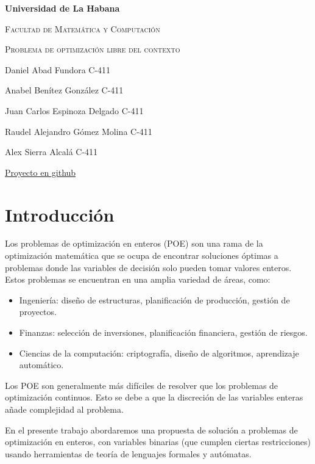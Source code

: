 \documentclass{article}
\begin{document}
\begin{titlepage}
    \centering
    {\bfseries\LARGE Universidad de La Habana \par}
    \vspace{1cm}
    {\scshape\Large Facultad de Matemática y Computación \par}
    \vspace{3cm}
    {\scshape\Huge Problema de optimización libre del contexto \par}
    \vfill

    {\Large Daniel Abad Fundora C-411 \par}
    {\Large Anabel Benítez González C-411 \par}
    {\Large Juan Carlos Espinoza Delgado C-411 \par}
    {\Large Raudel Alejandro Gómez Molina C-411 \par}
    {\Large Alex Sierra Alcalá C-411 \par}
    \vfill
    {\href{https://github.com/ARJ-Code/MMA-Project}{Proyecto en github} \par}
\end{titlepage}



\section*{Introducción}
Los problemas de optimización en enteros (POE) son una rama de la optimización matemática que se ocupa de encontrar soluciones óptimas a problemas 
donde las variables de decisión solo pueden tomar valores enteros. Estos problemas se encuentran en una amplia variedad de áreas, como:

\begin{itemize}
    \item Ingeniería: diseño de estructuras, planificación de producción, gestión de proyectos.
    \item Finanzas: selección de inversiones, planificación financiera, gestión de riesgos.
    \item Ciencias de la computación: criptografía, diseño de algoritmos, aprendizaje automático.
\end{itemize}

Los POE son generalmente más difíciles de resolver que los problemas de optimización continuos. 
Esto se debe a que la discreción de las variables enteras añade complejidad al problema.

En el presente trabajo abordaremos una propuesta de solución a problemas de optimización en enteros, con variables binarias (que cumplen ciertas restricciones) usando
herramientas de teoría de lenguajes formales y autómatas.
\end{document}
